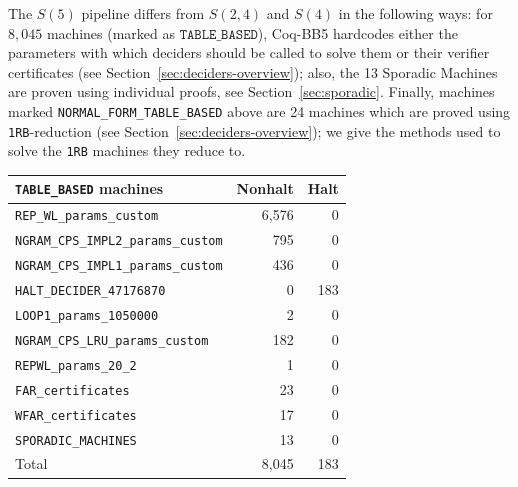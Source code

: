 \documentclass[a4paper,british]{article}
\theoremstyle{definition} %
\numberwithin{equation}{section}
\theoremstyle{definition} %
\newcommand{\CoqBB}{Coq-BB5\xspace}
\begin{document}
The $S(5)$ pipeline differs from $S(2,4)$ and $S(4)$ in the following ways: for $8{,}045$ machines (marked as $\texttt{TABLE\_BASED}$), \CoqBB hardcodes either the parameters with which deciders should be called to solve them or their verifier certificates (see Section~\ref{sec:deciders-overview}); also, the 13 Sporadic Machines are proven using individual \Coq proofs, see Section~\ref{sec:sporadic}. Finally, machines marked \texttt{NORMAL\_FORM\_TABLE\_BASED} above are 24 machines which are proved using \texttt{1RB}-reduction (see Section~\ref{sec:deciders-overview}); we give the methods used to solve the \texttt{1RB} machines they reduce to.
\begin{table}[H]
    \centering
    \begin{minipage}{0.55\linewidth}
        \centering
        \begin{tabular}{|lrr|}
            \hline
            \texttt{TABLE\_BASED} machines             & Nonhalt & Halt \\
            \hline
            \texttt{REP\_WL\_params\_custom}           & 6{,}576 & 0    \\
            \texttt{NGRAM\_CPS\_IMPL2\_params\_custom} & 795     & 0    \\
            \texttt{NGRAM\_CPS\_IMPL1\_params\_custom} & 436     & 0    \\
            \texttt{HALT\_DECIDER\_47176870}           & 0       & 183  \\
            \texttt{LOOP1\_params\_1050000}            & 2       & 0    \\
            \texttt{NGRAM\_CPS\_LRU\_params\_custom}   & 182     & 0    \\
            \texttt{REPWL\_params\_20\_2}              & 1       & 0    \\
            \texttt{FAR\_certificates}                 & 23      & 0    \\
            \texttt{WFAR\_certificates}                & 17      & 0    \\
            \texttt{SPORADIC\_MACHINES}                & 13      & 0    \\
            \hline
            Total                                      & 8{,}045 & 183  \\
            \hline
        \end{tabular}
    \end{minipage}%
    \hfill
    \begin{minipage}{0.35\linewidth}
        \centering
        \begin{tabular}{|lr|}

\end{tabular}
\end{minipage}
\end{table}
\end{document}

